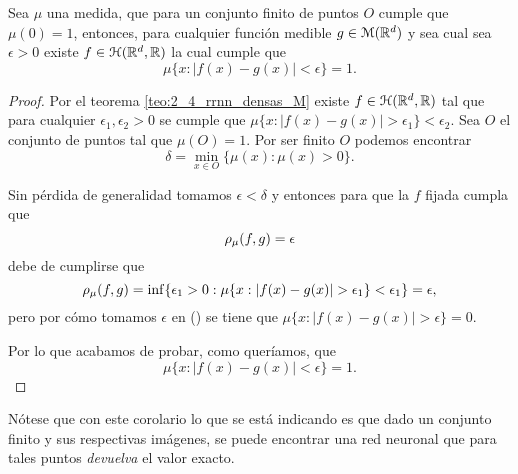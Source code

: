 \begin{corolario} \label{corolario:2_4_conjunto_finito}
    Sea $\mu$ una medida, que para
    un conjunto finito de puntos $O$ cumple que $\mu(0)=1$, 
    entonces, para cualquier función medible $g \in \mathcal{M}(\mathbb{R}^d)$
    y sea cual sea $\epsilon >0$ 
    existe $f \in \mathcal{H}(\mathbb{R}^d,\mathbb{R})$ la cual cumple que 
    \begin{equation}
        \mu\{ 
            x:
            |f(x) - g(x)| 
            < \epsilon
        \}
        = 1.
    \end{equation}

\end{corolario}
\begin{proof}
    Por el teorema \ref{teo:2_4_rrnn_densas_M} existe 
    $f \in \mathcal{H}(\mathbb{R}^d,\mathbb{R})$ tal que para cualquier 
    $\epsilon_1, \epsilon_2 >0$ se cumple que 
    $\mu \{x: |f(x) - g(x)| > \epsilon_1\} < \epsilon_2.$
    Sea $O$ el conjunto de puntos tal que $\mu(O) = 1.$
    Por ser finito $O$ podemos encontrar
    \begin{equation} \label{eq:2_4:definición_epsilon}
        \delta = \min_{x \in O} \{ 
            \mu(x) : \mu(x)>0
        \}. 
    \end{equation}

    Sin pérdida de generalidad tomamos $\epsilon < \delta$ y entonces
    para  que la $f$ fijada cumpla que
    \begin{equation}
        \rho_{\mu}(f,g) = \epsilon
    \end{equation}
    debe de cumplirse que 
    \begin{equation}
        \rho_{\mu}(f,g) =  \inf 
        \{
           \epsilon_1 > 0:
           \mu\{ 
            x:
            |f(x) - g(x)| 
            > \epsilon_1
        \}
        < \epsilon_1
        \} 
        = \epsilon,
    \end{equation}
    pero por cómo tomamos $\epsilon$ en () se
    tiene que $\mu\{ 
        x:
        |f(x) - g(x)| 
        > \epsilon
    \} = 0.$

    Por lo que acabamos de probar, como queríamos, que 
    \begin{equation}
        \mu\{ 
            x:
            |f(x) - g(x)| 
            < \epsilon
        \}
        = 1.
    \end{equation}
\end{proof}

Nótese que con este corolario lo que se está indicando es que dado
un conjunto finito y sus respectivas imágenes, se puede encontrar una red neuronal que para tales puntos \textit{devuelva} el valor exacto. 


